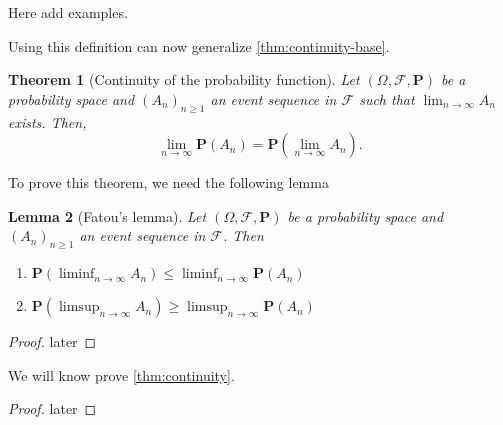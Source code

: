 \documentclass[11pt,a4paper]{article}
\theoremstyle{definition}
\theoremstyle{plain}
\newtheorem{theorem}{Theorem}[section]
\newtheorem{lemma}[theorem]{Lemma}
\newcommand{\Prob}{\mathbf{P}}
\begin{document}
  Here add examples.

  Using this definition can now generalize \autoref{thm:continuity-base}.
  \begin{theorem}[Continuity of the probability function]
  \label{thm:continuity}
    Let $(\Omega, \mathcal F, \Prob)$ be a probability space and
    $(A_n)_{n \geq 1}$ an event sequence in $\mathcal F$ such that
    $\lim_{n \to \infty} A_n$ exists. Then,
    \[
      \lim_{n \to \infty} \Prob(A_n) =
      \Prob\left(\lim_{n \to \infty} A_n\right).
    \]
  \end{theorem}
  
  To prove this theorem, we need the following lemma
  \begin{lemma}[Fatou's lemma]
    Let $(\Omega, \mathcal F, \Prob)$ be a probability space and
    $(A_n)_{n \geq 1}$ an event sequence in $\mathcal F$. Then
    \begin{enumerate}
      \item $\Prob(\liminf_{n \to \infty} A_n) \le
            \liminf_{n \to \infty} \Prob(A_n)$
      \item $\Prob(\limsup_{n \to \infty} A_n) \geq
            \limsup_{n \to \infty} \Prob(A_n)$
    \end{enumerate}
  \end{lemma}
  \begin{proof}
    later
  \end{proof}
  We will know prove \autoref{thm:continuity}.
  \begin{proof}
    later
  \end{proof}

  
\end{document}
